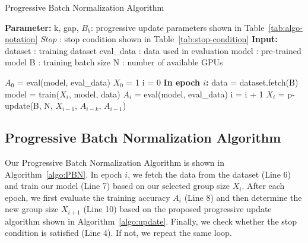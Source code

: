 \documentclass{llncs}
\begin{document}




\begin{algorithm}
    \caption{Progressive Batch Normalization Algorithm}
    \label{algo:PBN}
     \State \textbf{Parameter:} 
    \State    \quad   k, gap, $B_b$: progressive update parameters shown in Table~\ref{tab:algo-notation}
    \State    \quad   $Stop$ : stop condition shown in Table~\ref{tab:stop-condition}
    \State \textbf{Input:} 
    \State    \quad    dataset : training dataset 
    \State    \quad    eval\_data : data used in evaluation 
    \State    \quad    model : pre-trained model 
    \State    \quad    B : training batch size 
    \State    \quad    N : number of available GPUs
    
    \begin{algorithmic}[1]
        \State $A_0$ = eval(model, eval\_data)
        \State $X_0$ = 1
        \State i = 0
            \State \textbf{In epoch $i$:}
            \State \quad data = dataset.fetch(B)
            \State \quad model = train($X_i$, model, data) 
            \State $A_i$ = eval(model, eval\_data)
            \State i = i + 1
            \State $X_i$ = p-update(B, N, $X_{i-1}$,  $A_{i-k}$, $A_{i-1}$)
        \EndWhile
    \end{algorithmic}
\end{algorithm}

\subsection{Progressive Batch Normalization Algorithm}

Our Progressive Batch Normalization Algorithm is shown in Algorithm~\ref{algo:PBN}. In epoch $i$, we fetch the data from the dataset (Line 6) and train our model (Line 7) based on our selected group size $X_i$. After each epoch, we first evaluate the training accuracy $A_i$ (Line 8) and then determine the new group size $X_{i+1}$ (Line 10) based on the proposed progressive update algorithm shown in Algorithm~\ref{algo:update}. Finally, we check whether the stop condition is satisfied (Line 4). If not, we repeat the same loop.
\end{document}
